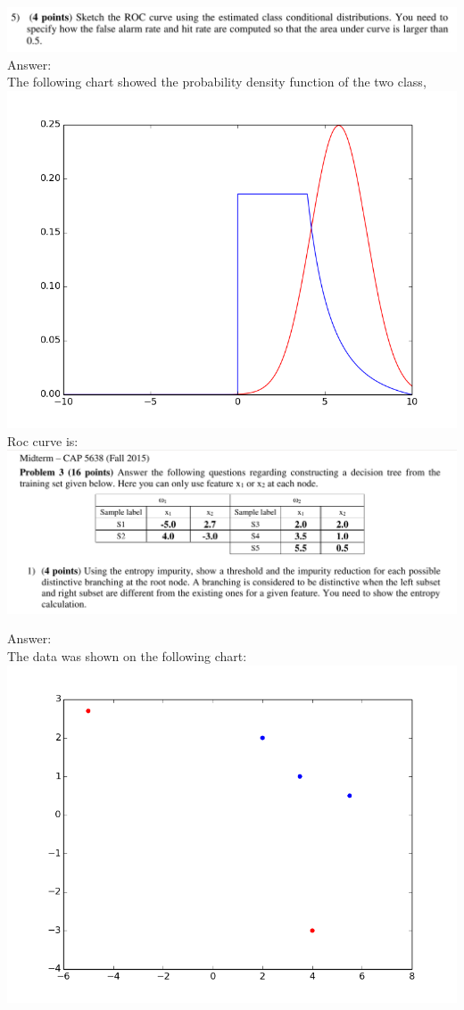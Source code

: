 \documentclass{article}
\begin{document}
\includegraphics[width=1\columnwidth]{problem2_5.png}
Answer:\\
The following chart showed the probability density function of the two class, \\ 
\includegraphics[scale=0.5]{roc_density.png}
Roc curve is:\\

\includegraphics[width=1\columnwidth]{problem3_1.png}

Answer:\\
The data was shown on the following chart:\\

\includegraphics[width=1\columnwidth]{tree_prob.png}
\end{document}
